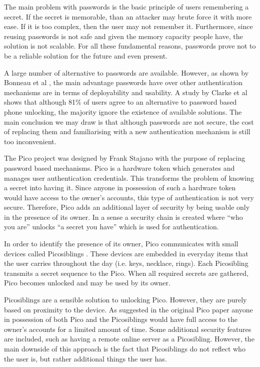 The main problem with passwords is the basic principle of users remembering a secret. If the secret is memorable, than an attacker may brute force it with more ease. If it is too complex, then the user may not remember it. Furthermore, since reusing passwords is not safe and given the memory capacity people have, the solution is not scalable. For all these fundamental reasons, passwords prove not to be a reliable solution for the future and even present.

A large number of alternative to passwords are available. However, as shown by Bonneau et al \cite{bonneau2012quest}, the main advantage passwords have over other authentication mechanisms are in terms of deployability and usability. A study by Clarke et al \cite{clarke2002acceptance} shows that although 81\% of users agree to an alternative to password based phone unlocking, the majority ignore the existence of available solutions. The main conclusion we may draw is that although passwords are not secure, the cost of replacing them and familiarising with a new authentication mechanism is still too inconvenient. 

The Pico project was designed by Frank Stajano \cite{stajano2011pico} with the purpose of replacing password based mechanisms. Pico is a hardware token which generates and manages user authentication credentials. This transforms the problem of knowing a secret into having it. Since anyone in possession of such a hardware token would have access to the owner's accounts, this type of authentication is not very secure. Therefore, Pico adds an additional layer of security by being usable only in the presence of its owner. In a sense a security chain is created where ``who you are'' unlocks ``a secret you have'' which is used for authentication.

In order to identify the presence of its owner, Pico communicates with small devices called Picosiblings \cite{stannard2012good}. These devices are embedded in everyday items that the user carries throughout the day (i.e. keys, necklace, rings). Each Picosibling transmits a secret sequence to the Pico. When all required secrets are gathered, Pico becomes unlocked and may be used by its owner.

Picosiblings are a sensible solution to unlocking Pico. However, they are purely based on proximity to the device. As suggested in the original Pico paper \cite{stajano2011pico} anyone in possession of both Pico and the Picosiblings would have full access to the owner's accounts for a limited amount of time. Some additional security features are included, such as having a remote online server as a Picosibling. However, the main downside of this approach is the fact that Picosiblings do not reflect who the user is, but rather additional things the user has.

